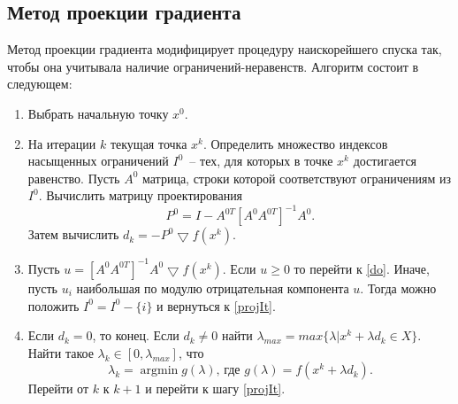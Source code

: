 \documentclass[10pt]{article}
\newcommand{\argmin}{\mathop{\mathrm{argmin}}\nolimits}
\begin{document}
	\subsection{Метод проекции градиента}
		Метод проекции градиента модифицирует процедуру наискорейшего спуска так, чтобы она учитывала наличие ограничений-неравенств. 
		Алгоритм состоит в следующем:
		\begin{enumerate}
			\item Выбрать начальную точку $x^0$.
			\item \label{projIt} На итерации $k$ текущая точка $x^k$. Определить множество индексов насыщенных ограничений $I^0$~-- 
				  тех, для которых в точке $x^k$ достигается равенство. Пусть $A^0$ матрица, 
				  строки которой соответствуют ограничениям из $I^0$. Вычислить матрицу проектирования 
				  $$P^0 = I - A^{0T} [A^0A^{0T}]^{-1} A^0.$$ Затем вычислить $d_k = - P^0 \bigtriangledown f(x^k).$
			\item \label{KunTackerCheck} Пусть $u = [A^0A^{0T}]^{-1} A^0 \bigtriangledown f(x^k)$. Если $u \ge 0$ то перейти к \ref{do}. 
				  Иначе, пусть $u_i$ наибольшая по модулю отрицательная компонента $u$. 
				  Тогда можно положить $I^0 = I^0 - \{i\}$ и вернуться к \ref{projIt}.	  
			\item \label{do} Если $d_k = 0$, то конец. Если $d_k \not = 0$ найти $\lambda_{max} = max\{\lambda | x^k + \lambda d_k \in X\}.$ 
				  Найти такое $\lambda_k \in [0, \lambda_{max}]$, что
				  $$\lambda_k = \argmin g(\lambda) \mbox{, где } g(\lambda) = f(x^k + \lambda d_k).$$
				  Перейти от $k$ к $k+1$ и перейти к шагу \ref{projIt}.	
		\end{enumerate}
\end{document}
